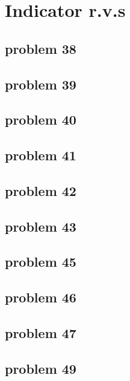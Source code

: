 \section{Indicator r.v.s}

\subsection{problem 38}


\subsection{problem 39}


\subsection{problem 40}


\subsection{problem 41}


\subsection{problem 42}


\subsection{problem 43}


\subsection{problem 45}


\subsection{problem 46}


\subsection{problem 47}


\subsection{problem 49}



